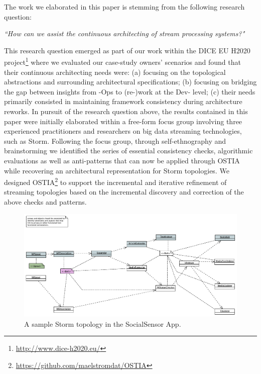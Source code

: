 
The work we elaborated in this paper is stemming from the following research question:

\begin{center}
\emph{``How can we assist the continuous architecting of stream processing systems?"}
\end{center}

This research question emerged as part of our work within the DICE EU H2020 project\footnote{\url{http://www.dice-h2020.eu/}} where we evaluated our case-study owners' scenarios and found that their continuous architecting needs were: (a) focusing on the topological abstractions and surrounding architectural specifications; (b) focusing on bridging the gap between insights from -Ops to (re-)work at the Dev- level; (c) their needs primarily consisted in maintaining framework consistency during architecture reworks.
In pursuit of the research question above, the results contained in this paper were initially elaborated within a free-form focus group \cite{focusgroup} involving three experienced practitioners and researchers on big data streaming technologies, such as Storm. Following the focus group, through self-ethnography \cite{selfeth} and brainstorming we identified the series of essential consistency checks, algorithmic evaluations as well as anti-patterns that can now be applied through OSTIA while recovering an architectural representation for Storm topologies. We designed OSTIA\footnote{\url{https://github.com/maelstromdat/OSTIA}} to support the incremental and iterative refinement of streaming topologies based on the incremental discovery and correction of the above checks and patterns.

\begin{figure}
\begin{center}
\includegraphics[width=12cm]{images/socialsensor}
\caption{A sample Storm topology in the SocialSensor App.}
\end{center}
\label{socialsensor-topology}
\end{figure}


